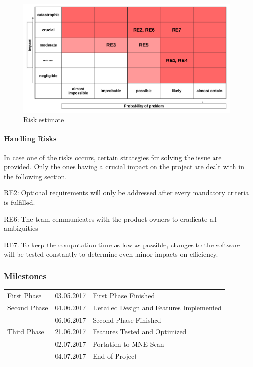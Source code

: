 \begin{figure}[h]
	\begin{center}
		\includegraphics[width= 15cm]{figures/risikoabschaetzung.png}
		\caption{Risk estimate}
	\end{center}
\end{figure}

\paragraph{Handling Risks}

In case one of the risks occurs, certain strategies for solving the issue are provided. Only the ones having a crucial impact on the project are dealt with in the following section. 

\begin{aims}
	
	\item[RE2:]Optional requirements will only be addressed after every mandatory criteria is fulfilled.
	\item[RE6:]The team communicates with the product owners to eradicate all ambiguities.
	\item[RE7:]To keep the computation time as low as possible, changes to the software will be tested constantly to 						   determine even minor impacts on efficiency. 	
	
\end{aims}

\clearpage

\subsubsection{Milestones}

\begin{tabular}{lll}
	First Phase & 03.05.2017 & First Phase Finished\\
	Second Phase & 04.06.2017 & Detailed Design and Features Implemented\\
				& 06.06.2017 & Second Phase Finished\\
	Third Phase & 21.06.2017 & Features Tested and Optimized\\          
				& 02.07.2017 & Portation to MNE Scan\\
				& 04.07.2017 & End of Project\\
\end{tabular}


